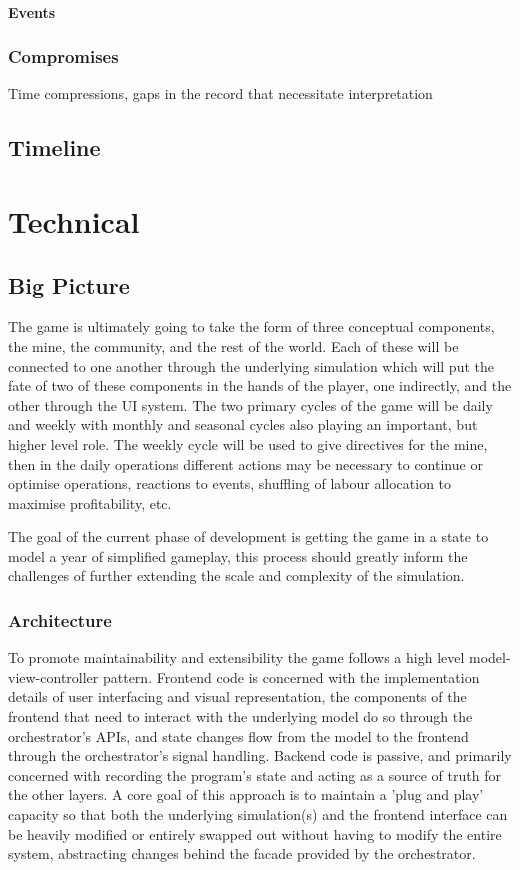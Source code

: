\documentclass[12pt, a4paper]{scrreprt}
\begin{document}
	\subsection{Events}
	\section{Compromises}
	Time compressions, gaps in the record that necessitate interpretation
	\chapter{Timeline}
	\part{Technical}
	\chapter{Big Picture}
	The game is ultimately going to take the form of three conceptual components, the mine, the community, and the rest of the world. Each of these will be connected to one another through the underlying simulation which will put the fate of two of these components in the hands of the player, one indirectly, and the other through the UI system. The two primary cycles of the game will be daily and weekly with monthly and seasonal cycles also playing an important, but higher level role. The weekly cycle will be used to give directives for the mine, then in the daily operations different actions may be necessary to continue or optimise operations, reactions to events, shuffling of labour allocation to maximise profitability, etc. 
	
	The goal of the current phase of development is getting the game in a state to model a year of simplified gameplay, this process should greatly inform the challenges of further extending the scale and complexity of the simulation.
	\section{Architecture}
	To promote maintainability and extensibility the game follows a high level model-view-controller pattern. Frontend code is concerned with the implementation details of user interfacing and visual representation, the components of the frontend that need to interact with the underlying model do so through the orchestrator's APIs, and state changes flow from the model to the frontend through the orchestrator's signal handling. Backend code is passive, and primarily concerned with recording the program's state and acting as a source of truth for the other layers. A core goal of this approach is to maintain a 'plug and play' capacity so that both the underlying simulation(s) and the frontend interface can be heavily modified or entirely swapped out without having to modify the entire system, abstracting changes behind the facade provided by the orchestrator.
\end{document}
